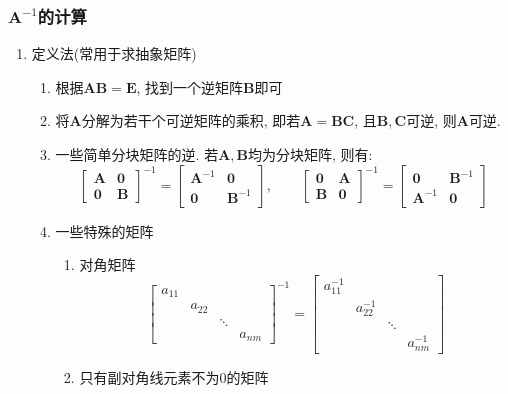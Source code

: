 \subsubsection{$ \bm{A}^{-1} $的计算}
\begin{enumerate}
\item 定义法(常用于求抽象矩阵)
\begin{enumerate}
\item 根据$ \bm{A}\bm{B}=\bm{E} $, 找到一个逆矩阵$ \bm{B} $即可
\item 将$ \bm{A} $分解为若干个可逆矩阵的乘积, 即若$ \bm{A}=\bm{B}\bm{C} $, 且$ \bm{B},\bm{C} $可逆, 则$ \bm{A} $可逆.
\item 一些简单分块矩阵的逆. 若$ \bm{A},\bm{B} $均为分块矩阵, 则有:
\begin{equation*}
\begin{bmatrix}
\bm{A} & \bm{0} \\
\bm{0} & \bm{B}
\end{bmatrix}^{-1}=
\begin{bmatrix}
\bm{A}^{-1} & \bm{0} \\
\bm{0} & \bm{B}^{-1}
\end{bmatrix}, \qquad
\begin{bmatrix}
\bm{0} & \bm{A} \\
\bm{B} & \bm{0}
\end{bmatrix}^{-1}=
\begin{bmatrix}
\bm{0} & \bm{B}^{-1} \\
\bm{A}^{-1} & \bm{0}
\end{bmatrix}
\end{equation*}
\item 一些特殊的矩阵
\begin{enumerate}
\item 对角矩阵
\begin{equation*}
\begin{bmatrix}
a_{11} & & & \\
& a_{22} & & \\
& & \ddots & \\
& & & a_{nm}
\end{bmatrix}^{-1}=
\begin{bmatrix}
a_{11}^{-1} & & & \\
& a_{22}^{-1} & & \\
& & \ddots & \\
& & & a_{nm}^{-1}
\end{bmatrix}
\end{equation*}
\item 只有副对角线元素不为$ 0 $的矩阵

\end{enumerate}
\end{enumerate}
\end{enumerate}
